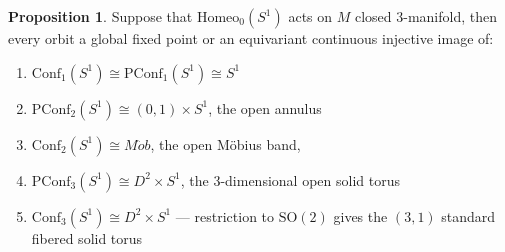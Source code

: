 \documentclass[10pt, oneside]{article}
\newcommand{\SO}[1][2]{\text{SO}(#1)}
\newcommand{\homeo}[1][S^1]{\text{Homeo}_0(#1)}
\newcommand{\conf}[2][S^1]{\text{Conf}_{#2}(#1)}
\newcommand{\pconf}[2][S^1]{\text{PConf}_{#2}(#1)}
\theoremstyle{definition}
\newtheorem{prop}{Proposition}[section]
\theoremstyle{definition}
\begin{document}
\begin{prop}\label{prop:orbit-computation}
    Suppose that $\homeo$ acts on $M$ closed 3-manifold, then every orbit a global fixed point or an equivariant continuous injective image of:
    \begin{enumerate}
        \item $\conf[S^1]{1} \cong \pconf[S^1]{1}\cong S^1$
        \item $\pconf[S^1]{2} \cong (0,1)\times S^1$, the open annulus
        \item $\conf[S^1]{2} \cong M\ddot{o}b$, the open M\"{o}bius band,
        \item $\pconf[S^1]{3} \cong D^2\times S^1$, the 3-dimensional open solid torus
        \item $\conf[S^1]{3} \cong D^2\times S^1$ --- restriction to $\SO$ gives the $(3, 1)$ standard fibered solid torus
    \end{enumerate}
\end{prop}
\end{document}
